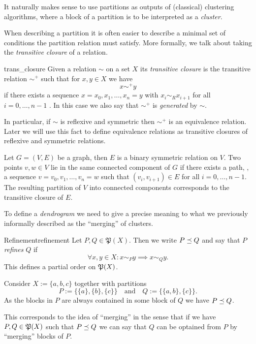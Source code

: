 It naturally makes sense to use partitions as outputs of (classical) clustering algorithms, where a block of a partition is to be interpreted as a \emph{cluster}.

When describing a partition it is often easier to describe a minimal set of conditions the partition relation must satisfy. More formally, we talk about taking the \emph{transitive closure} of a relation.

\begin{definition}{}{trans_closure}
    Given a relation $\sim$ on a set $X$ its \emph{transitive closure} is the transitive relation $\sim^+$ such that for $x,y \in X$ we have
    $$
    x \sim^+ y
    $$
    if there exists a sequence $x = x_0, x_1, \dots, x_n = y$ with $x_i \sim_R x_{i+1}$ for all $i = 0, \dots, n-1$ \cite[p.337]{Lidl1997-kc}. In this case we also say that $\sim^+$ is \emph{generated} by $\sim$.
\end{definition}

In particular, if $\sim$ is reflexive and symmetric then $\sim^+$ is an equivalence relation.
Later we will use this fact to define equivalence relations as transitive closures of reflexive and symmetric relations.

\begin{example}{}{}
Let $G = (V,E)$ be a graph, then $E$ is a binary symmetric relation on $V$. Two points $v,w \in V$ lie in the same connected component of $G$ if there exists a path, \ie, a sequence $v =v_0, v_1, \dots, v_n = w$ such that $(v_i, v_{i+1}) \in E$ for all $i = 0, \dots, n-1$. The resulting partition of $V$ into connected components corresponds to the transitive closure of $E$.
\end{example}

To define a \emph{dendrogram} we need to give a precise meaning to what we previously informally described as the ``merging'' of clusters.

\begin{definition}{Refinement}{refinement}
Let $P, Q \in \mathfrak{P}(X)$. Then we write $P \refines Q$ and say that $P$ \emph{refines} $Q$ if
\begin{equation*}
    \forall x,y \in X: x \sim_P y \implies x \sim_Q y.
\end{equation*}
This defines a partial order on $\P(X)$.
\end{definition}

\begin{example}{}{}
Consider $X := \{a,b,c\}$ together with partitions
$$
P := \{\{a\}, \{b\}, \{c\}\} \quad \text{and} \quad Q := \{\{a,b\}, \{c\}\}.
$$
As the blocks in $P$ are always contained in some block of $Q$ we have $P \refines Q$.
\end{example}
This corresponds to the idea of ``merging'' in the sense that if we have $P,Q \in \P(X)$ such that $P \refines Q$ we can say that $Q$ can be optained from $P$ by ``merging'' blocks of $P$.

